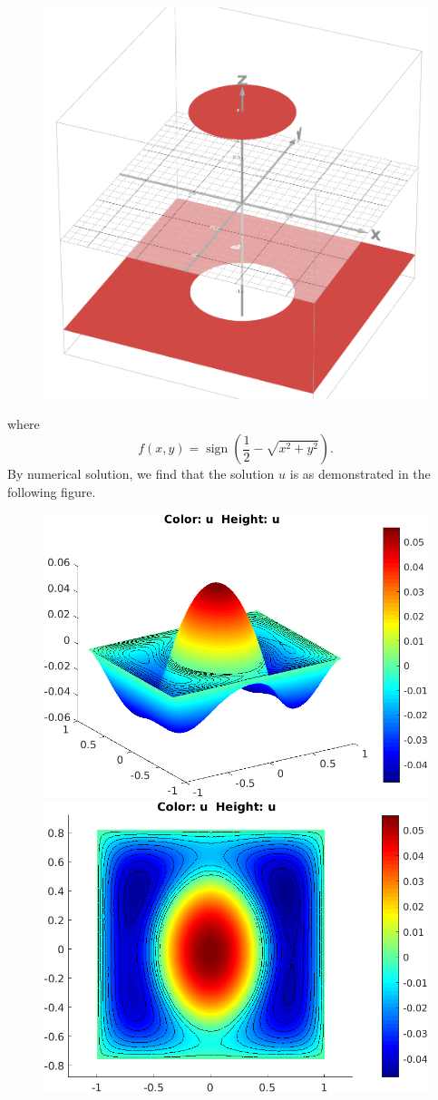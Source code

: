 \begin{figure}[h!]
	\centering
	\includegraphics[width=0.25\linewidth]{Images/discontFunction}
\end{figure}

\FloatBarrier

where 
\[ f(x,y) = \operatorname{sign}(\frac{1}{2} - \sqrt{x^2 + y^2}). \]
By numerical solution, we find that the solution $ u $ is as demonstrated in the following figure.
\begin{figure}[h!]
	\centering
	\begin{minipage}{0.45\linewidth}
		\includegraphics[width=\linewidth]{Images/weakSolutionPoissonEquation.png}
		
	\end{minipage}
	\hfill %
	\begin{minipage}{0.45\linewidth}
		\includegraphics[width=\linewidth]{Images/weakSolutionPoissonEquationContour.png}
		
	\end{minipage}
\end{figure}
